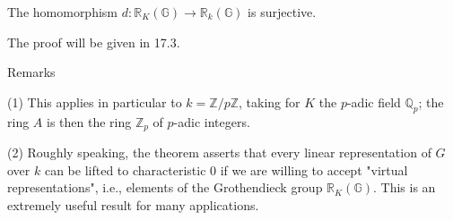 The homomorphism $d: \mathbb{R}_K(\mathbb{G}) \to \mathbb{R}_k(\mathbb{G})$ is surjective.

The proof will be given in 17.3.

Remarks

(1) This applies in particular to $k = \mathbb{Z}/p\mathbb{Z}$, taking for $K$ the $p$-adic field $\mathbb{Q}_p$; the ring $A$ is then the ring $\mathbb{Z}_p$ of $p$-adic integers.

(2) Roughly speaking, the theorem asserts that every linear representation of $G$ over $k$ can be lifted to characteristic 0 if we are willing to accept "virtual representations", i.e., elements of the Grothendieck group $\mathbb{R}_K(\mathbb{G})$. This is an extremely useful result for many applications.
